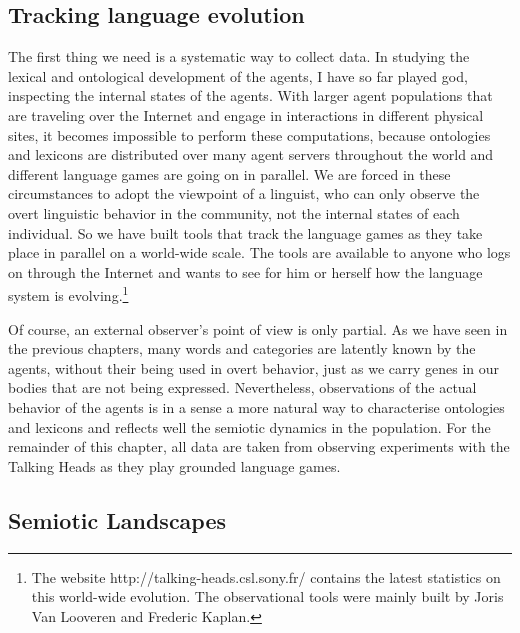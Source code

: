 \subsection{Tracking language evolution}

The first thing we need is a systematic
way to collect data. In studying the lexical 
and ontological development 
of the agents, I have so far played god, inspecting 
the internal states of the agents. With larger agent
populations that 
are traveling over the Internet and engage in interactions in 
different physical sites, it becomes impossible
to perform these computations, because ontologies and 
lexicons are distributed over many agent servers
throughout the world and different language games are
going on in parallel. We 
are forced in these circumstances to adopt the
viewpoint of a linguist, who
can only observe the overt linguistic behavior in the community,
not the internal states of each individual. 
So we have built tools that track the language games 
as they take place in parallel on a world-wide scale. The tools 
are available to anyone who logs on through the Internet
and wants to see for him or herself how the language
system is evolving.\footnote{The website http://talking-heads.csl.sony.fr/ 
contains the latest statistics on this world-wide evolution. 
The observational tools were mainly built by Joris Van 
Looveren and Frederic Kaplan.}

Of course, an external observer's
point of view is only partial. As we have seen in the
previous chapters, many 
words and categories are latently known by the agents, 
without their being used in overt behavior, just as 
we carry genes in our bodies that are not 
being expressed. Nevertheless, 
observations of the actual behavior of the agents is
in a sense a more natural way to characterise 
ontologies and lexicons and reflects well the
semiotic dynamics in the population. For the remainder
of this chapter, all data
are taken from observing experiments with the Talking Heads as
they play grounded language games. 

\subsection{Semiotic Landscapes}

